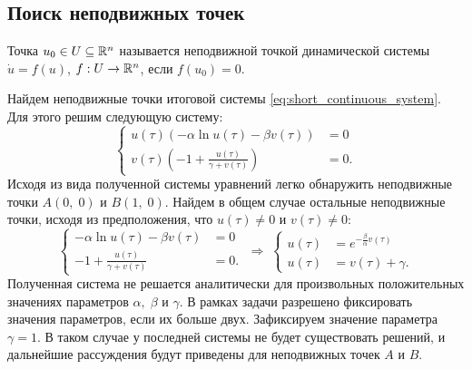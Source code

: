\subsection{Поиск неподвижных точек}
\begin{definition}
        Точка $u_0 \in U \subseteq \mathbb{R}^n$ называется неподвижной точкой динамической системы $\dot u = f(u)$, $f: U \rightarrow \mathbb{R}^n$, если $f(u_0) = 0$. \cite[стр.~20]{bratus10}
\end{definition}

Найдем неподвижные точки итоговой системы \ref{eq:short_continuous_system}. Для этого решим следующую систему:
$$
        \left\{
        \begin{aligned}
                u(\tau)\left( -\alpha\ln u(\tau) - \beta v(\tau) \right) &= 0 \\
                v(\tau)\left( -1 + \frac{u(\tau)}{\gamma + v(\tau)}\right) &= 0.
        \end{aligned}
        \right.
$$
Исходя из вида полученной системы уравнений легко обнаружить неподвижные точки $A (0,\;0)$ и $B (1,\; 0)$. Найдем в общем случае остальные неподвижные точки, исходя из предположения, что $u(\tau) \neq 0$ и $v(\tau) \neq 0$:
$$
        \left\{
        \begin{aligned}
                -\alpha\ln u(\tau) - \beta v(\tau)  &= 0 \\
                -1 + \frac{u(\tau)}{\gamma + v(\tau)} &= 0.
        \end{aligned}
        \right.
        \;
        \Longrightarrow
        \;
        \left\{
        \begin{aligned}
                u(\tau) &= e^{-\frac{\beta}{\alpha}v(\tau)} \\
                u(\tau) &= v(\tau) + \gamma.
        \end{aligned}
        \right.  
$$
Полученная система не решается аналитически для произвольных положительных значениях параметров $\alpha,\; \beta$ и $\gamma$. В рамках задачи разрешено фиксировать значения параметров, если их больше двух. Зафиксируем значение параметра $\gamma = 1$. В таком случае у последней системы не будет существовать решений, и дальнейшие рассуждения будут приведены для неподвижных точек $A$ и $B$.